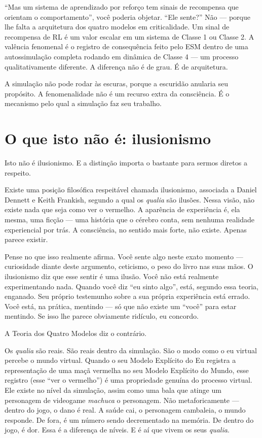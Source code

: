 \documentclass[11pt, twoside, openright]{book}
\begin{document}
``Mas um sistema de aprendizado por reforço tem sinais de recompensa que orientam o comportamento'', você poderia objetar. ``Ele sente?'' Não --- porque lhe falta a arquitetura dos quatro modelos em criticalidade. Um sinal de recompensa de RL é um valor escalar em um sistema de Classe 1 ou Classe 2. A valência fenomenal é o registro de consequência feito pelo ESM dentro de uma autossimulação completa rodando em dinâmica de Classe 4 --- um processo qualitativamente diferente. A diferença não é de grau. É de arquitetura.

A simulação não pode rodar às escuras, porque a escuridão anularia seu propósito. A fenomenalidade não é um recurso extra da consciência. É o mecanismo pelo qual a simulação faz seu trabalho.

\section*{O que isto não é: ilusionismo}

Isto não é ilusionismo. E a distinção importa o bastante para sermos diretos a respeito.

Existe uma posição filosófica respeitável chamada ilusionismo, associada a Daniel Dennett e Keith Frankish, segundo a qual os \textit{qualia} são ilusões. Nessa visão, não existe nada que seja como ver o vermelho. A aparência de experiência é, ela mesma, uma ficção --- uma história que o cérebro conta, sem nenhuma realidade experiencial por trás. A consciência, no sentido mais forte, não existe. Apenas parece existir.

Pense no que isso realmente afirma. Você sente algo neste exato momento --- curiosidade diante deste argumento, ceticismo, o peso do livro nas suas mãos. O ilusionismo diz que esse sentir é uma ilusão. Você não está realmente experimentando nada. Quando você diz ``eu sinto algo'', está, segundo essa teoria, enganado. Seu próprio testemunho sobre a sua própria experiência está errado. Você está, na prática, mentindo --- só que não existe um ``você'' para estar mentindo. Se isso lhe parece obviamente ridículo, eu concordo.

A Teoria dos Quatro Modelos diz o contrário.

Os \textit{qualia} são reais. São reais dentro da simulação. São o modo como o eu virtual percebe o mundo virtual. Quando o seu Modelo Explícito do Eu registra a representação de uma maçã vermelha no seu Modelo Explícito do Mundo, esse registro (esse ``ver o vermelho'') é uma propriedade genuína do processo virtual. Ele existe no nível da simulação, assim como uma bala que atinge um personagem de videogame \textit{machuca} o personagem. Não metaforicamente --- dentro do jogo, o dano é real. A saúde cai, o personagem cambaleia, o mundo responde. De fora, é um número sendo decrementado na memória. De dentro do jogo, é dor. Essa é a diferença de níveis. E é aí que vivem os seus \textit{qualia}.
\end{document}
